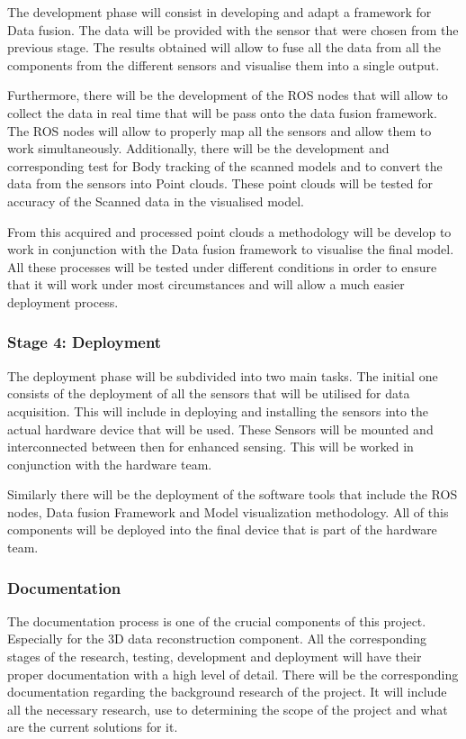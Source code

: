 \documentclass[12pt]{report}
\begin{document}
The development phase will consist in developing and adapt a framework for Data fusion. The data will be provided with the sensor that were chosen from the previous stage. 
The results obtained will allow to fuse all the data from all the components from the different sensors and visualise them into a single output.

Furthermore, there will be the development of the ROS nodes that will allow to collect the data in real time that will be pass onto the data fusion framework.
The ROS nodes will allow to properly map all the sensors and allow them to work simultaneously. Additionally, there will be the development and corresponding test for Body tracking of the scanned models and to convert the data from the sensors into Point clouds. 
These point clouds will be tested for accuracy of the Scanned data in the visualised model. 

From this acquired and processed point clouds a methodology will be develop to work in conjunction with the Data fusion framework to visualise the final model. 
All these processes will be tested under different conditions in order to ensure that it will work under most circumstances and will allow a much easier deployment process. 

\subsubsection{Stage 4: Deployment}
The deployment phase will be subdivided into two main tasks. The initial one  consists of the deployment of all the sensors that will be utilised for data acquisition. 
This will include in deploying and installing the sensors into the actual hardware device that will be used. 
These Sensors will be mounted and interconnected between then for enhanced sensing. This will be worked in conjunction with the hardware team. 

Similarly there will be the deployment of the software tools that include the ROS nodes, Data fusion Framework and Model visualization methodology. 
All of this components will be deployed into the final device that is part of the hardware team. 

\subsubsection{Documentation}
The documentation process is one of the crucial components of this project. 
Especially for the 3D data reconstruction component. All the corresponding stages of the research, testing, development and deployment will have their proper documentation with a high level of detail. 
There will be the corresponding documentation regarding the background research of the project. 
It will include all the necessary research, use to determining the scope of the project and what are the current solutions for it. 
\end{document}
